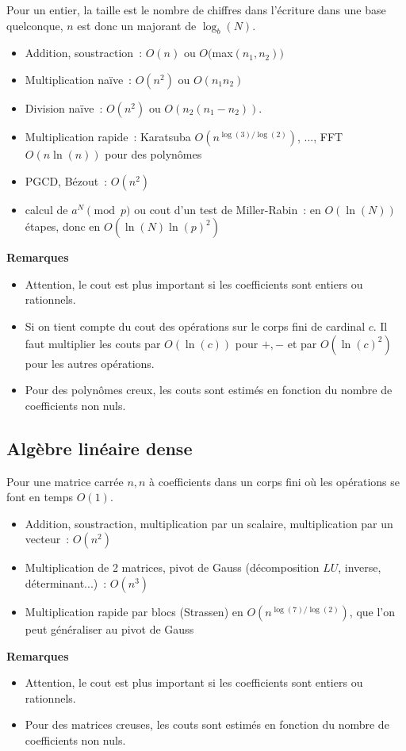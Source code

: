 \documentclass[a4paper,11pt]{book}
\begin{document}
\begin{giacjshere}
Pour un entier, la taille est le nombre de chiffres dans l'\'ecriture
dans une base quelconque, $n$ est donc un majorant de $\log_b(N)$.
\begin{itemize}
\item Addition, soustraction~: $O(n)$ ou $O($max$(n_1,n_2))$
\item Multiplication na\"ive~: $O(n^2)$ ou $O(n_1n_2)$
\item Division na\"ive~: $O(n^2)$ ou $O(n_2(n_1-n_2))$.
\item Multiplication rapide~: Karatsuba $O(n^{\log(3)/\log(2)})$, ..., FFT
$O(n\ln(n))$ pour des polyn\^omes
\item PGCD, B\'ezout~: $O(n^2)$
\item calcul de $a^N \pmod p$ ou cout d'un test de Miller-Rabin~: 
en $O(\ln(N))$ \'etapes, donc en $O(\ln(N)\ln(p)^2)$
\end{itemize}

{\bf Remarques}
\begin{itemize}
\item Attention, le cout est plus important si les coefficients sont entiers
ou rationnels. 
\item Si on tient compte du cout des op\'erations sur le corps fini
de cardinal $c$. Il faut multiplier les couts par $O(\ln(c))$ pour $+,-$
et par $O(\ln(c)^2)$ pour les autres op\'erations.
\item Pour des polyn\^omes creux, les couts sont
estim\'es en fonction du nombre de coefficients non nuls.
\end{itemize}


\subsection{Alg\`ebre lin\'eaire dense}
Pour une matrice carr\'ee $n,n$ \`a coefficients dans un corps fini o\`u
les op\'erations se font en temps $O(1)$.
\begin{itemize}
\item Addition, soustraction, multiplication par un scalaire,
multiplication par un vecteur~: $O(n^2)$
\item Multiplication de 2 matrices, pivot de Gauss
(d\'ecomposition $LU$, inverse, d\'eterminant...)~: $O(n^3)$
\item Multiplication rapide par blocs (Strassen) en $O(n^{\log(7)/\log(2)})$,
que l'on peut g\'en\'eraliser au pivot de Gauss
\end{itemize}

{\bf Remarques}
\begin{itemize}
\item Attention, le cout est plus important si les coefficients sont entiers
ou rationnels.
\item Pour des matrices creuses, les couts sont estim\'es en fonction du nombre
de coefficients non nuls.
\end{itemize}


\end{giacjshere}
\end{document}

